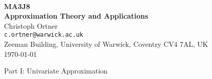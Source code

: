 \documentclass[a4paper, 11pt, reqno]{article}
\numberwithin{equation}{section}
\numberwithin{theorem}{section}
\begin{document}
\begin{center}
  \hfill \\[4cm]
  {\Large \bf MA3J8} \\[1mm]
  {\Large \bf Approximation Theory and Applications} \\[4mm]
  {\large Christoph Ortner} \\
  {\small \tt c.ortner@warwick.ac.uk} \\
  {\small Zeeman Building, University of Warwick, Coventry CV4 7AL, UK} \\[4mm]
  {\today}
\end{center}

\clearpage
\quad
\clearpage

\tableofcontents

\clearpage



\clearpage

\vspace{5cm}

{\huge Part I: Univariate Approximation}

\clearpage


\clearpage


\clearpage


\clearpage




\end{document}
